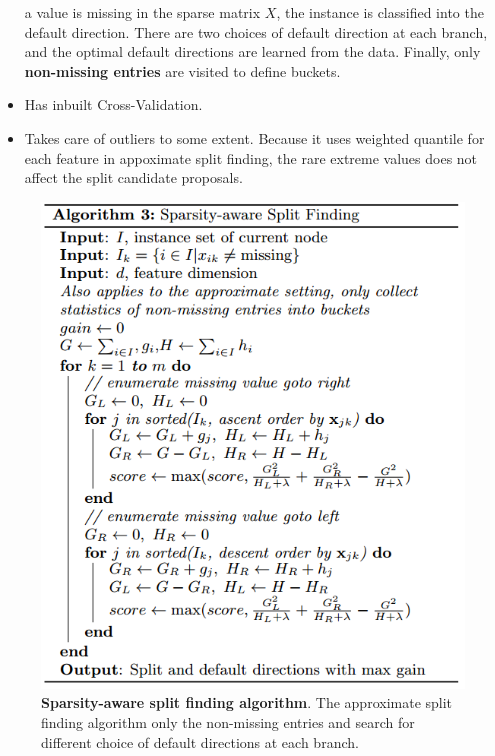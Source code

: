\documentclass[11pt]{article}
\begin{document}
\begin{itemize}
a value is missing in the sparse matrix $X$, the instance is classified into the default direction. There are two choices of default direction at each branch, and the optimal default directions are learned from the data. Finally, only \textbf{non-missing entries} are visited to define buckets. 
\item Has inbuilt Cross-Validation.
\item Takes care of outliers to some extent. Because it uses weighted quantile for each feature in appoximate split finding, the rare extreme values does not affect the split candidate proposals.  
\end{itemize}

\begin{figure}
\begin{minipage}[t]{1\linewidth}
  \centering
  \centerline{\includegraphics[scale = 0.5]{sparsity_split.png}}
\end{minipage}
\caption{\footnotesize{\textbf{Sparsity-aware split finding algorithm}. The approximate split finding algorithm only the non-missing entries and search for different choice of default directions at each branch. \citep{chen2016xgboost}}}
\label{fig: sparse_split}
\end{figure}

\newpage


\end{document}
